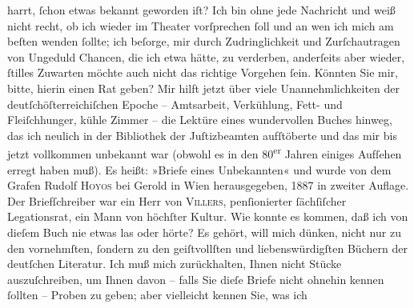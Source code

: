 \begin{ledgroupsized}[t]{13cm}
               harrt, ſchon etwas bekannt geworden iſt? Ich bin ohne jede Nachricht und weiß nicht
               recht, ob ich wieder im Theater
               vorſprechen ſoll und an wen ich mich am beſten wenden ſollte; ich beſorge, mir durch
               Zudringlichkeit und Zurſchautragen von Ungeduld Chancen, die ich etwa hätte, zu
               verderben, anderſeits aber wieder, ſtilles Zuwarten möchte auch nicht das {\pb}richtige Vorgehen ſein. Könnten Sie mir,
               bitte, hierin einen Rat geben?\pend
           \pstart
           Mir hilft jetzt über viele Unannehmlichkeiten der deutſchöſterreichiſchen Epoche – Amtsarbeit, Verkühlung, Fett- und
               Fleiſchhunger, kühle Zimmer – die Lektüre eines wundervollen Buches hinweg, das ich
               neulich in der Bibliothek der Juſtizbeamten
               aufſtöberte und das mir bis jetzt vollkommen unbekannt war (obwohl es in den
                     80\textsuperscript{er} Jahren einiges Aufſehen erregt
               haben muß). Es heißt: »Briefe eines Unbekannten«
               und wurde von dem Grafen Rudolf \textsc{Hoyos} bei Gerold in Wien herausgegeben, 1887 in zweiter Auflage. Der Briefſchreiber
               war ein Herr von \textsc{Villers}, penſionierter ſächſiſcher Legationsrat, ein
               Mann von höchſter Kultur. Wie konnte es kommen, daß ich von dieſem Buch nie etwas las
               oder hörte? Es gehört, will mich dünken, nicht nur zu den vornehmſten, ſondern zu den
               geiſtvollſten und liebenswürdigſten Büchern der deutſchen {\pb}Literatur. Ich muß mich zurückhalten,
               Ihnen nicht Stücke auszuſchreiben, um Ihnen davon – falls Sie dieſe Briefe nicht
               ohnehin kennen ſollten – Proben zu geben; aber vielleicht kennen Sie, was ich

\end{ledgroupsized}
